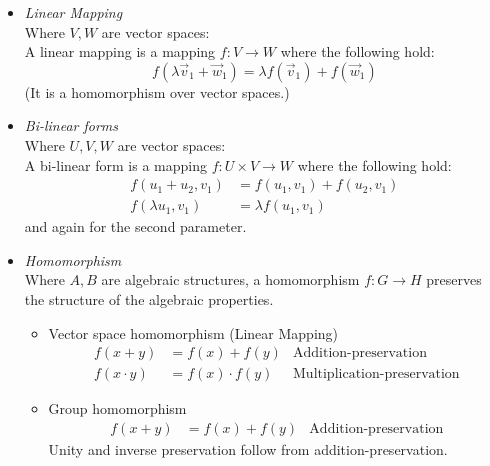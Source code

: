 \documentclass[11pt,a4paper]{article}
\begin{document}
\begin{itemize}

    \item \emph{Linear Mapping} \\
        Where $V, W$ are vector spaces: \\
        A linear mapping is a mapping $f : V \to W$ where the following hold:
        \[
            f(\lambda \vec{v}_1 + \vec{w}_1) = \lambda  f(\vec{v}_1) + f(\vec{w}_1)
        \]
        (It is a homomorphism over vector spaces.)
    \item \emph{Bi-linear forms} \\
        Where $U, V, W$ are vector spaces: \\
        A bi-linear form is a mapping $f : U \times V \to W$ where the following hold:
        \begin{align*}
            f(u_1 + u_2, v_1)   & = f(u_1, v_1) + f(u_2, v_1) \\
            f(\lambda u_1, v_1) & = \lambda f(u_1, v_1)
        \end{align*}
        and again for the second parameter.
    \item \emph{Homomorphism} \\
        Where $A, B$ are algebraic structures,
        a homomorphism $f : G \to H$ preserves the structure of the algebraic properties.

        \begin{itemize}
            \item Vector space homomorphism (Linear Mapping)
                \begin{align*}
                    f(x + y) &= f(x) + f(y) &\text{Addition-preservation} \\
                    f(x \cdot y) &= f(x) \cdot f(y) &\text{Multiplication-preservation}
                \end{align*}

            \item Group homomorphism
                \begin{align*}
                    f(x + y) &= f(x) + f(y) & \text{Addition-preservation}
                \end{align*}
                Unity and inverse preservation follow from addition-preservation.


\end{itemize}
\end{itemize}
\end{document}
